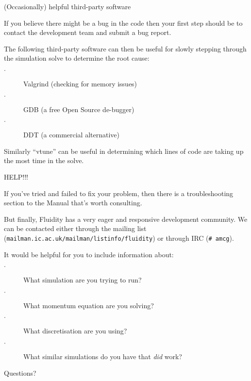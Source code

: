 \documentclass[professionalfonts, 8pt]{beamer}
\begin{document}

\begin{frame}{(Occasionally) helpful third-party software}

If you believe there might be a bug in the code
then your first step should be to contact the development team and submit a bug report.

\vspace{1ex}
The following third-party software can then be useful for slowly stepping through the simulation solve to determine the root cause:
\vspace{1ex}

\begin{description}
 \item[$\cdot$] Valgrind (checking for memory issues)
 \item[$\cdot$] GDB (a free Open Source de-bugger)
 \item[$\cdot$] DDT (a commercial alternative) 
\end{description}

Similarly ``vtune'' can be useful in determining which lines of code are taking up the most time in the solve.

\end{frame}


\begin{frame}{HELP!!!}

If you've tried and failed to fix your problem, then there is a troubleshooting section to the Manual that's worth consulting.

\vspace{1ex}
But finally, Fluidity has a very eager and responsive development community.  
We can be contacted either through the mailing list ({\tt mailman.ic.ac.uk/mailman/listinfo/fluidity})
or through IRC ({\tt \# amcg}).

\vspace{1ex}
It would be helpful for you to include information about:
\begin{description}
 \item[$\cdot$] What simulation are you trying to run?
 \item[$\cdot$] What momentum equation are you solving?
 \item[$\cdot$] What discretisation are you using?
 \item[$\cdot$] What similar simulations do you have that {\it did} work?
 
\end{description}
\end{frame}

\begin{frame}
\begin{center}
{\Huge Questions?}
\end{center}
\end{frame}
\end{document}

